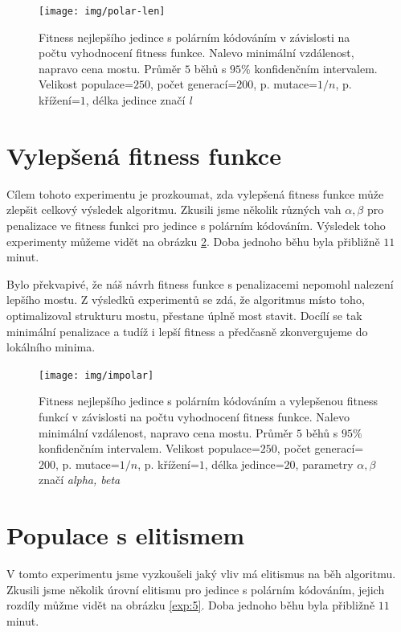 \begin{figure}[p]\centering
\texttt{[image: img/polar-len]}
\caption{Fitness nejlepšího jedince s polárním kódováním v závislosti na počtu vyhodnocení fitness funkce. Nalevo minimální vzdálenost, napravo cena mostu. Průměr $5$ běhů s $95\%$ konfidenčním intervalem. Velikost populace=$250$, počet generací=$200$, p. mutace=$1/n$, p. křížení=$1$, délka jedince značí \emph{l}}
\label{exp:35}
\end{figure}

\section{Vylepšená fitness funkce}

Cílem tohoto experimentu je prozkoumat, zda vylepšená fitness funkce může zlepšit celkový výsledek algoritmu. Zkusili jsme několik různých vah $\alpha, \beta$ pro penalizace ve fitness funkci pro jedince s polárním kódováním. Výsledek toho experimenty můžeme vidět na obrázku \ref{exp:4}. Doba jednoho běhu byla přibližně $11$ minut.

Bylo překvapivé, že náš návrh fitness funkce s penalizacemi nepomohl nalezení lepšího mostu. Z výsledků experimentů se zdá, že algoritmus místo toho, optimalizoval strukturu mostu, přestane úplně most stavit. Docílí se tak minimální penalizace a tudíž i lepší fitness a předčasně zkonvergujeme do lokálního minima. 

\begin{figure}[p]\centering
\texttt{[image: img/impolar]}
\caption{Fitness nejlepšího jedince s polárním kódováním a vylepšenou fitness funkcí v závislosti na počtu vyhodnocení fitness funkce. Nalevo minimální vzdálenost, napravo cena mostu. Průměr $5$ běhů s $95\%$ konfidenčním intervalem. Velikost populace=$250$, počet generací=$200$, p. mutace=$1/n$, p. křížení=$1$, délka jedince=$20$, parametry $\alpha, \beta$ značí \emph{alpha, beta}}
\label{exp:4}
\end{figure}


\section{Populace s elitismem} 

V tomto experimentu jsme vyzkoušeli jaký vliv má elitismus na běh algoritmu. Zkusili jsme několik úrovní elitismu pro jedince s polárním kódováním, jejich rozdíly můžme vidět na obrázku \ref{exp:5}. Doba jednoho běhu byla přibližně $11$ minut.

